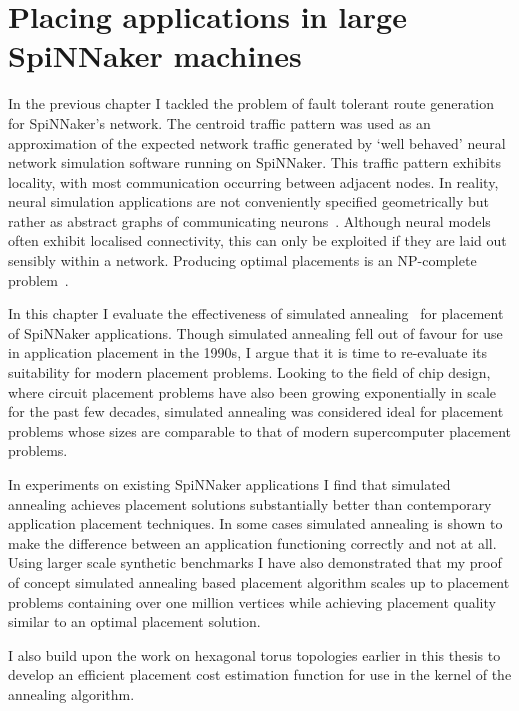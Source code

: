 \chapter{Placing applications in large SpiNNaker machines}
	
	\label{sec:placement}
	
	In the previous chapter I tackled the problem of fault tolerant route
	generation for SpiNNaker's network. The centroid traffic pattern was used as
	an approximation of the expected network traffic generated by `well behaved'
	neural network simulation software running on SpiNNaker. This traffic pattern
	exhibits locality, with most communication occurring between adjacent nodes.
	In reality, neural simulation applications are not conveniently specified
	geometrically but rather as abstract graphs of communicating
	neurons~\cite{davison08,eliasmith04}. Although neural models often exhibit
	localised connectivity, this can only be exploited if they are laid out
	sensibly within a network. Producing optimal placements is an NP-complete
	problem~\cite{hoefler11}.
	
	In this chapter I evaluate the effectiveness of simulated
	annealing~\cite{kirkpatrick83} for placement of SpiNNaker applications.
	Though simulated annealing fell out of favour for use in application
	placement in the 1990s, I argue that it is time to re-evaluate its
	suitability for modern placement problems. Looking to the field of chip
	design, where circuit placement problems have also been growing exponentially
	in scale for the past few decades, simulated annealing was considered ideal
	for placement problems whose sizes are comparable to that of modern
	supercomputer placement problems.
	
	In experiments on existing SpiNNaker applications I find that simulated
	annealing achieves placement solutions substantially better than contemporary
	application placement techniques. In some cases simulated annealing is shown
	to make the difference between an application functioning correctly and not
	at all. Using larger scale synthetic benchmarks I have also demonstrated that
	my proof of concept simulated annealing based placement algorithm scales up
	to placement problems containing over one million vertices while achieving
	placement quality similar to an optimal placement solution.
	
	I also build upon the work on hexagonal torus topologies earlier in this
	thesis to develop an efficient placement cost estimation function for use in
	the kernel of the annealing algorithm.
	
